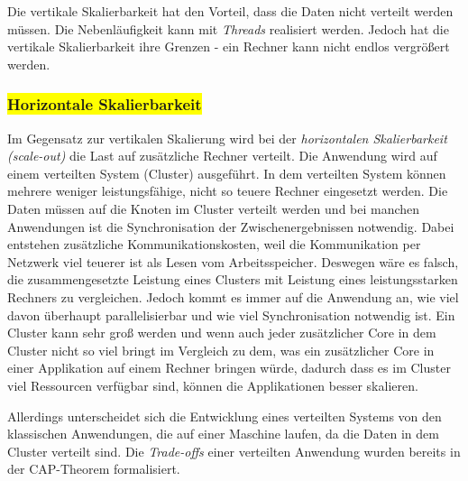 Die vertikale Skalierbarkeit hat den Vorteil, dass die Daten nicht verteilt werden müssen. Die Nebenläufigkeit kann mit \textit{Threads} realisiert werden. Jedoch hat die vertikale Skalierbarkeit ihre Grenzen - ein Rechner kann nicht endlos vergrößert werden. 

\subsubsection{\colorbox{yellow}{Horizontale Skalierbarkeit}}

Im Gegensatz zur vertikalen Skalierung wird bei der \textit{horizontalen Skalierbarkeit (scale-out)} die Last auf zusätzliche Rechner verteilt. Die Anwendung wird auf einem verteilten System (Cluster) ausgeführt. In dem verteilten System können mehrere weniger leistungsfähige, nicht so teuere Rechner eingesetzt werden. Die Daten müssen auf die Knoten im Cluster verteilt werden und bei manchen Anwendungen ist die Synchronisation der Zwischenergebnissen notwendig. Dabei entstehen zusätzliche Kommunikationskosten, weil die Kommunikation per Netzwerk viel teuerer ist als Lesen vom Arbeitsspeicher. Deswegen wäre es falsch, die zusammengesetzte Leistung eines Clusters mit Leistung eines leistungsstarken Rechners zu vergleichen. Jedoch kommt es immer auf die Anwendung an, wie viel davon überhaupt parallelisierbar und wie viel Synchronisation notwendig ist. Ein Cluster kann sehr groß werden und wenn auch jeder zusätzlicher Core in dem Cluster nicht so viel bringt im Vergleich zu dem, was ein zusätzlicher Core in einer Applikation auf einem Rechner bringen würde, dadurch dass es im Cluster viel Ressourcen verfügbar sind, können die Applikationen besser skalieren.

Allerdings unterscheidet sich die Entwicklung eines verteilten Systems von den klassischen Anwendungen, die auf einer Maschine laufen, da die Daten in dem Cluster verteilt sind. Die \textit{Trade-offs} einer verteilten Anwendung wurden bereits in der CAP-Theorem formalisiert.

